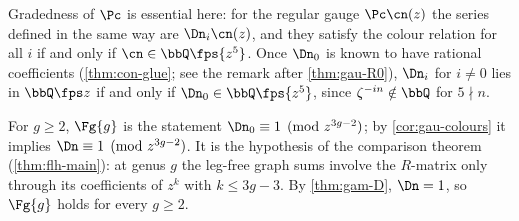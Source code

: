 Gradedness of $\Pc$ is essential here: for the regular gauge $\Pc\cn(z)$ the series defined in the same way are $\Dn_i\cn(z)$, and they satisfy the colour relation for all $i$ if and only if $\cn\in\bbQ\fps{z^5}$. Once $\Dn_0$ is known to have rational coefficients (\cref{thm:con-glue}; see the remark after \cref{thm:gau-R0}), $\Dn_i$ for $i\neq0$ lies in $\bbQ\fps z$ if and only if $\Dn_0\in\bbQ\fps{z^5}$, since $\zeta^{-in}\notin\bbQ$ for $5\nmid n$.

\begin{defn}
\label{def:gau-Fg}
For $g\geq2$, $\Fg{g}$ is the statement $\Dn_0\equiv1\pmod{z^{3g-2}}$; by \cref{cor:gau-colours} it implies $\Dn\equiv1\pmod{z^{3g-2}}$. It is the hypothesis of the comparison theorem (\cref{thm:flh-main}): at genus $g$ the leg-free graph sums involve the $R$-matrix only through its coefficients of $z^k$ with $k\leq3g-3$. By \cref{thm:gam-D}, $\Dn=1$, so $\Fg{g}$ holds for every $g\geq2$.
\end{defn}
